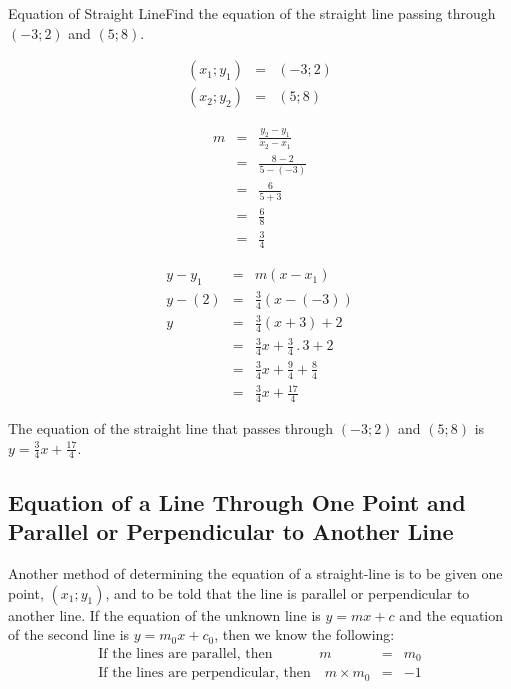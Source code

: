 \begin{wex}{Equation of Straight Line}{Find the equation of the straight line passing through $(-3;2)$ and $(5;8)$.\\}{
\begin{eqnarray*}
(x_1;y_1)&=&(-3;2)\\
(x_2;y_2)&=&(5;8)
\end{eqnarray*}

\begin{eqnarray*}
m &=&\frac{y_2-y_1}{x_2-x_1}\\
&=&\frac{8-2}{5-(-3)}\\
&=&\frac{6}{5+3}\\
&=&\frac{6}{8}\\
&=&\frac{3}{4}
\end{eqnarray*}

\begin{eqnarray*}
y-y_1&=&m(x-x_1)\\
y-(2)&=&\frac{3}{4}(x-(-3))\\
y&=&\frac{3}{4}(x+3) + 2\\
&=&\frac{3}{4}x + \frac{3}{4} \,.\, 3 + 2\\
&=&\frac{3}{4}x + \frac{9}{4} + \frac{8}{4}\\
&=&\frac{3}{4}x + \frac{17}{4}
\end{eqnarray*}

The equation of the straight line that passes through $(-3;2)$ and $(5;8)$ is $y=\frac{3}{4}x + \frac{17}{4}$.}
\end{wex}

\subsection{Equation of a Line Through One Point and Parallel or Perpendicular to Another Line}

Another method of determining the equation of a straight-line is to be given one point, $(x_1;y_1)$, and to be told that the line is parallel or perpendicular to another line. If the equation of the unknown line is $y=mx+c$ and the equation of the second line is $y=m_0x+c_0$, then we know the following:
\begin{eqnarray}
\mbox{If the lines are parallel, then }\quad\quad\quad m&=& m_0\\
\mbox{If the lines are perpendicular, then}\quad m \times m_0&=& -1
\end{eqnarray}

